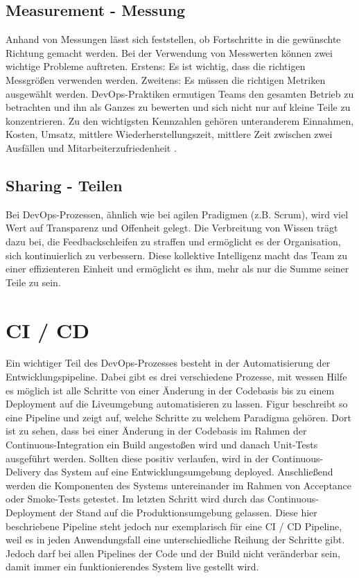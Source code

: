 \subsection{Measurement - Messung}
Anhand von Messungen lässt sich feststellen, ob Fortschritte in die gewünschte Richtung gemacht werden. Bei der Verwendung von Messwerten können zwei wichtige Probleme auftreten. Erstens: Es ist wichtig, dass die richtigen Messgrößen verwenden werden. Zweitens: Es müssen die richtigen Metriken ausgewählt werden. DevOps-Praktiken ermutigen Teams den gesamten Betrieb zu betrachten und ihn als Ganzes zu bewerten und sich nicht nur auf kleine Teile zu konzentrieren. Zu den wichtigsten Kennzahlen gehören unteranderem Einnahmen, Kosten, Umsatz, mittlere Wiederherstellungszeit, mittlere Zeit zwischen zwei Ausfällen und Mitarbeiterzufriedenheit \cite{mohammad2018improve}.

\subsection{Sharing - Teilen}
Bei DevOps-Prozessen, ähnlich wie bei agilen Pradigmen (z.B. Scrum), wird viel Wert auf Transparenz und Offenheit gelegt. Die Verbreitung von Wissen trägt dazu bei, die Feedbackschleifen zu straffen und ermöglicht es der Organisation, sich kontinuierlich zu verbessern. Diese kollektive Intelligenz macht das Team zu einer effizienteren Einheit und ermöglicht es ihm, mehr als nur die Summe seiner Teile zu sein.

\section{CI / CD}

Ein wichtiger Teil des DevOps-Prozesses besteht in der Automatisierung der Entwicklungspipeline. Dabei gibt es drei verschiedene Prozesse, mit wessen Hilfe es möglich ist alle Schritte von einer Änderung in der Codebasis bis zu einem Deployment auf die Liveumgebung automatisieren zu lassen.
Figur beschreibt so eine Pipeline und zeigt auf, welche Schritte zu welchem Paradigma gehören. Dort ist zu sehen, dass bei einer Änderung in der Codebasis im Rahmen der Continuous-Integration ein Build angestoßen wird und danach Unit-Tests ausgeführt werden. Sollten diese positiv verlaufen, wird in der Continuous-Delivery das System auf eine Entwicklungsumgebung deployed. Anschließend werden die Komponenten des Systems untereinander im Rahmen von Acceptance oder Smoke-Tests  getestet. Im letzten Schritt wird durch das Continuous-Deployment der Stand auf die Produktionsumgebung gelassen. Diese hier beschriebene Pipeline steht jedoch nur exemplarisch für eine CI / CD Pipeline, weil es in jeden Anwendungsfall eine unterschiedliche Reihung der Schritte gibt. Jedoch darf bei allen Pipelines der Code und der Build nicht veränderbar sein, damit immer ein funktionierendes System live gestellt wird. 

